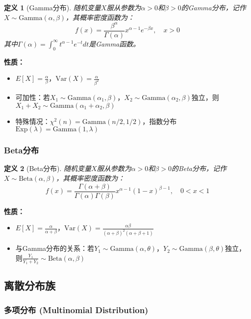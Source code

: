 \documentclass[12pt,a4paper]{article}
\newtheorem{definition}{定义}[section]
\theoremstyle{remark}
\begin{document}
\begin{definition}[Gamma分布]
随机变量$X$服从参数为$\alpha > 0$和$\beta > 0$的Gamma分布，记作$X \sim \text{Gamma}(\alpha, \beta)$，其概率密度函数为：
$$f(x) = \frac{\beta^\alpha}{\Gamma(\alpha)} x^{\alpha-1} e^{-\beta x}, \quad x > 0$$
其中$\Gamma(\alpha) = \int_0^\infty t^{\alpha-1} e^{-t} dt$是Gamma函数。
\end{definition}

\textbf{性质：}
\begin{itemize}
\item $E[X] = \frac{\alpha}{\beta}$，$\text{Var}(X) = \frac{\alpha}{\beta^2}$
\item 可加性：若$X_1 \sim \text{Gamma}(\alpha_1, \beta)$，$X_2 \sim \text{Gamma}(\alpha_2, \beta)$独立，则$X_1 + X_2 \sim \text{Gamma}(\alpha_1 + \alpha_2, \beta)$
\item 特殊情况：$\chi^2(n) = \text{Gamma}(n/2, 1/2)$，指数分布$\text{Exp}(\lambda) = \text{Gamma}(1, \lambda)$
\end{itemize}

\subsubsection{Beta分布}

\begin{definition}[Beta分布]
随机变量$X$服从参数为$\alpha > 0$和$\beta > 0$的Beta分布，记作$X \sim \text{Beta}(\alpha, \beta)$，其概率密度函数为：
$$f(x) = \frac{\Gamma(\alpha + \beta)}{\Gamma(\alpha)\Gamma(\beta)} x^{\alpha-1} (1-x)^{\beta-1}, \quad 0 < x < 1$$
\end{definition}

\textbf{性质：}
\begin{itemize}
\item $E[X] = \frac{\alpha}{\alpha + \beta}$，$\text{Var}(X) = \frac{\alpha\beta}{(\alpha + \beta)^2(\alpha + \beta + 1)}$
\item 与Gamma分布的关系：若$Y_1 \sim \text{Gamma}(\alpha, \theta)$，$Y_2 \sim \text{Gamma}(\beta, \theta)$独立，则$\frac{Y_1}{Y_1 + Y_2} \sim \text{Beta}(\alpha, \beta)$
\end{itemize}

\subsection{离散分布族}

\subsubsection{多项分布 (Multinomial Distribution)}
\end{document}
